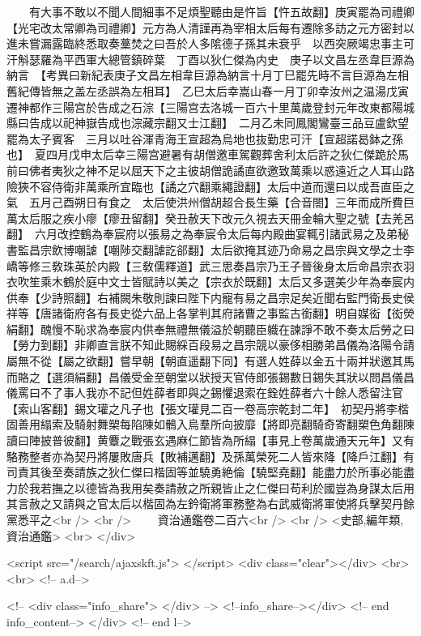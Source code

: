 　　有大事不敢以不聞人間細事不足煩聖聽由是忤旨【忤五故翻】庚寅罷為司禮卿【光宅改太常卿為司禮卿】元方為人清謹再為宰相太后每有遷除多訪之元方密封以進未嘗漏露臨終悉取奏藳焚之曰吾於人多隂德子孫其未衰乎　以西突厥竭忠事主可汗斛瑟羅為平西軍大總管鎮碎葉　丁酉以狄仁傑為内史　庚子以文昌左丞韋巨源為納言　【考異曰新紀表庚子文昌左相韋巨源為納言十月丁巳罷先時不言巨源為左相舊紀傳皆無之盖左丞誤為左相耳】　乙巳太后幸嵩山春一月丁卯幸汝州之温湯戊寅遷神都作三陽宫於告成之石淙【三陽宫去洛城一百六十里萬歲登封元年改東都陽城縣曰告成以祀神嶽告成也淙藏宗翻又士江翻】　二月乙未同鳳閣鸞臺三品豆盧欽望罷為太子賓客　三月以吐谷渾青海王宣超為烏地也抜勤忠可汗【宣超諾曷鉢之孫也】　夏四月戊申太后幸三陽宫避暑有胡僧邀車駕觀葬舍利太后許之狄仁傑跪於馬前曰佛者夷狄之神不足以屈天下之主彼胡僧詭譎直欲邀致萬乘以惑遠近之人耳山路險狹不容侍衛非萬乘所宜臨也【譎之穴翻乘繩證翻】太后中道而還曰以成吾直臣之氣　五月己酉朔日有食之　太后使洪州僧胡超合長生藥【合音閤】三年而成所費巨萬太后服之疾小瘳【瘳丑留翻】癸丑赦天下改元久視去天冊金輪大聖之號【去羌呂翻】　六月改控鶴為奉宸府以張易之為奉宸令太后每内殿曲宴輒引諸武易之及弟秘書監昌宗飲博嘲謔【嘲陟交翻謔訖郤翻】太后欲掩其迹乃命易之昌宗與文學之士李嶠等修三敎珠英於内殿【三敎儒釋道】武三思奏昌宗乃王子晉後身太后命昌宗衣羽衣吹笙乘木鶴於庭中文士皆賦詩以美之【宗衣於既翻】太后又多選美少年為奉宸内供奉【少詩照翻】右補闕朱敬則諫曰陛下内寵有易之昌宗足矣近聞右監門衛長史侯祥等【唐諸衛府各有長史從六品上各掌判其府諸曹之事監古銜翻】明自媒衒【衒熒絹翻】醜慢不恥求為奉宸内供奉無禮無儀溢於朝聽臣軄在諫諍不敢不奏太后勞之曰【勞力到翻】非卿直言朕不知此賜綵百段易之昌宗競以豪侈相勝弟昌儀為洛陽令請屬無不從【屬之欲翻】嘗早朝【朝直遥翻下同】有選人姓薛以金五十兩并狀邀其馬而賂之【選須絹翻】昌儀受金至朝堂以狀授天官侍郎張錫數日錫失其狀以問昌儀昌儀罵曰不了事人我亦不記但姓薛者即與之錫懼退索在銓姓薛者六十餘人悉留注官【索山客翻】錫文瓘之凡子也【張文瓘見二百一卷高宗乾封二年】　初契丹將李楷固善用䌈索及騎射舞槊每陷陳如鶻入烏羣所向披靡【將即亮翻騎奇寄翻槊色角翻陳讀曰陣披普彼翻】黄麞之戰張玄遇麻仁節皆為所䌈【事見上卷萬歲通天元年】又有駱務整者亦為契丹將屢敗唐兵【敗補邁翻】及孫萬榮死二人皆來降【降戶江翻】有司責其後至奏請族之狄仁傑曰楷固等並驍勇絶倫【驍堅堯翻】能盡力於所事必能盡力於我若撫之以德皆為我用矣奏請赦之所親皆止之仁傑曰苟利於國豈為身謀太后用其言赦之又請與之官太后以楷固為左鈐衛將軍務整為右武威衛將軍使將兵擊契丹餘黨悉平之<br />
<br />
　　資治通鑑卷二百六<br />
<br />
<史部,編年類,資治通鑑>  <br>
   </div> 

<script src="/search/ajaxskft.js"> </script>
 <div class="clear"></div>
<br>
<br>
 <!-- a.d-->

 <!--
<div class="info_share">
</div> 
-->
 <!--info_share--></div>   <!-- end info_content-->
  </div> <!-- end l-->

